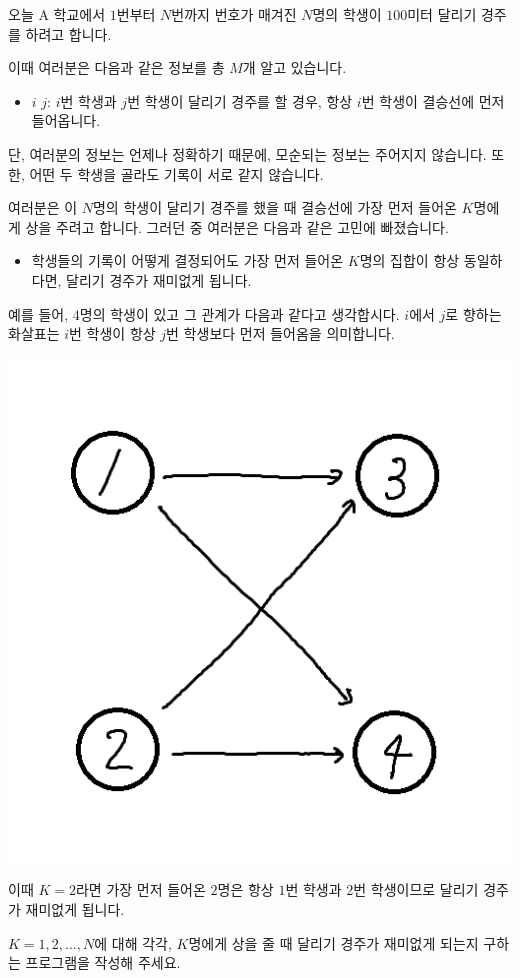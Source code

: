 오늘 A 학교에서 $1$번부터 $N$번까지 번호가 매겨진 $N$명의 학생이 $100$미터 달리기 경주를 하려고 합니다.

이때 여러분은 다음과 같은 정보를 총 $M$개 알고 있습니다.

\begin{itemize}
\item $i$ $j$: $i$번 학생과 $j$번 학생이 달리기 경주를 할 경우, 항상 $i$번 학생이 결승선에 먼저 들어옵니다.
\end{itemize}

단, 여러분의 정보는 언제나 정확하기 때문에, 모순되는 정보는 주어지지 않습니다. 또한, 어떤 두 학생을 골라도 기록이 서로 같지 않습니다.

여러분은 이 $N$명의 학생이 달리기 경주를 했을 때 결승선에 가장 먼저 들어온 $K$명에게 상을 주려고 합니다. 그러던 중 여러분은 다음과 같은 고민에 빠졌습니다.

\begin{itemize}
\item 학생들의 기록이 어떻게 결정되어도 가장 먼저 들어온 $K$명의 집합이 항상 동일하다면, 달리기 경주가 재미없게 됩니다.
\end{itemize}

예를 들어, $4$명의 학생이 있고 그 관계가 다음과 같다고 생각합시다. $i$에서 $j$로 향하는 화살표는 $i$번 학생이 항상 $j$번 학생보다 먼저 들어옴을 의미합니다.

\begin{center}
  \includegraphics[scale=0.5]{winnerset.png}
\end{center}

이때 $K=2$라면 가장 먼저 들어온 $2$명은 항상 $1$번 학생과 $2$번 학생이므로 달리기 경주가 재미없게 됩니다.

$K=1,2,\ldots,N$에 대해 각각, $K$명에게 상을 줄 때 달리기 경주가 재미없게 되는지 구하는 프로그램을 작성해 주세요.